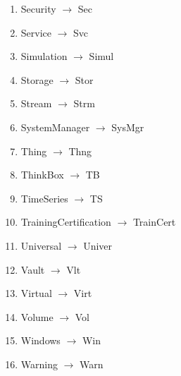 \documentclass[12pt]{article}
\begin{document}
{\begin{multicols}{3}
\begin{enumerate}
    \item Security $\rightarrow$  Sec
    \item Service $\rightarrow$  Svc
    \item Simulation $\rightarrow$  Simul
    \item Storage $\rightarrow$  Stor
    \item Stream $\rightarrow$  Strm
    \item SystemManager $\rightarrow$  SysMgr
    \item Thing $\rightarrow$  Thng
    \item ThinkBox $\rightarrow$  TB
    \item TimeSeries $\rightarrow$  TS
    \item TrainingCertification $\rightarrow$  TrainCert
    \item Universal $\rightarrow$  Univer
    \item Vault $\rightarrow$  Vlt
    \item Virtual $\rightarrow$  Virt
    \item Volume $\rightarrow$  Vol
    \item Windows $\rightarrow$  Win
    \item Warning $\rightarrow$  Warn
  \end{enumerate}
\end{multicols}
}

\printindex
\printindex[macros]
\end{document}
